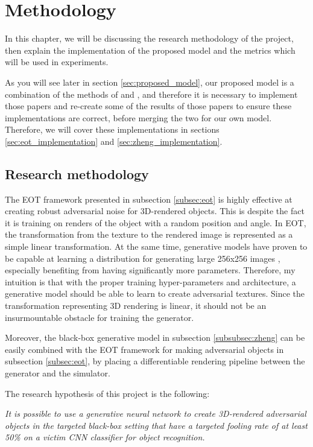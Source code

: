 \chapter{Methodology}
    \label{chap:methodology}
    
In this chapter, we will be discussing the research methodology of the project, then explain the implementation of the proposed model and the metrics which will be used in experiments.

As you will see later in section \ref{sec:proposed_model}, our proposed model is a combination of the methods of \cite{athalye} and \cite{zheng_black_box_GAN}, and therefore it is necessary to implement those papers and re-create some of the results of those papers to ensure these implementations are correct, before merging the two for our own model. Therefore, we will cover these implementations in sections \ref{sec:eot_implementation} and \ref{sec:zheng_implementation}.
    
\section{Research methodology}

The EOT framework presented in subsection \ref{subsec:eot} is highly effective at creating robust adversarial noise for 3D-rendered objects. This is despite the fact it is training on renders of the object with a random position and angle. In EOT, the transformation from the texture to the rendered image is represented as a simple linear transformation. At the same time, generative models have proven to be capable at learning a distribution for generating large 256x256 images \cite{big_gan}, especially benefiting from having significantly more parameters. Therefore, my intuition is that with the proper training hyper-parameters and architecture, a generative model should be able to learn to create adversarial textures. Since the transformation representing 3D rendering is linear, it should not be an insurmountable obstacle for training the generator.

Moreover, the black-box generative model in subsection \ref{subsubsec:zheng} can be easily combined with the EOT framework for making adversarial objects in subsection \ref{subsec:eot}, by placing a differentiable rendering pipeline between the generator and the simulator.

\newpage
The research hypothesis of this project is the following: 

\textit{It is possible to use a generative neural network to create 3D-rendered adversarial objects in the targeted black-box setting that have a targeted fooling rate of at least 50\% on a victim CNN classifier for object recognition.}

